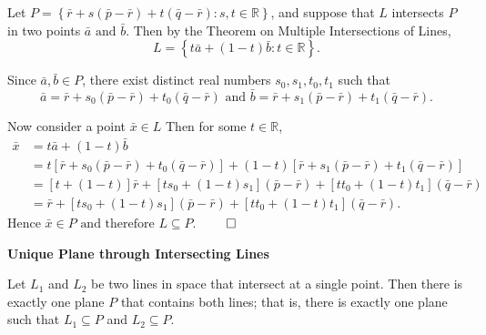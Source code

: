 \begin{proofbox}
    Let \(P = \left\{ \bar{r} + s(\bar{p} - \bar{r}) + t(\bar{q} - \bar{r}) : s, t \in \mathbb{R} \right\}\), and suppose that \(L\) intersects
    \(P\) in two points \(\bar{a} \text{ and } \bar{b}\). Then by the Theorem on Multiple Intersections of Lines,
    \[
    L = \left\{t\bar{a} + (1 - t)\bar{b} : t \in \mathbb{R}\right\}.
    \]

    Since \(\bar{a},\bar{b} \in P\), there exist distinct real numbers \(s_0,s_1,t_0,t_1\) such that
    \[
    \bar{a} = \bar{r} + s_0(\bar{p} - \bar{r}) + t_0(\bar{q} - \bar{r}) \text{ and } \bar{b} = \bar{r} + s_1(\bar{p} - \bar{r}) + t_1(\bar{q} - \bar{r}).
    \]

    Now consider a point \(\bar{x} \in L\) Then for some \(t \in \mathbb{R}\),
   \[
\begin{aligned}
\bar{x} &= t\bar{a} + (1 - t)\bar{b} \\
&= t\left[ \bar{r} + s_0(\bar{p} - \bar{r}) + t_0(\bar{q} - \bar{r}) \right] + (1 - t)\left[ \bar{r} + s_1(\bar{p} - \bar{r}) + t_1(\bar{q} - \bar{r}) \right] \\
&= [t + (1 - t)]\bar{r} + [ts_0 + (1 - t)s_1](\bar{p} - \bar{r}) + [tt_0 + (1 - t)t_1](\bar{q} - \bar{r}) \\
&= \bar{r} + [ts_0 + (1 - t)s_1](\bar{p} - \bar{r}) + [tt_0 + (1 - t)t_1](\bar{q} - \bar{r}).
\end{aligned}
\]
Hence \(\bar{x} \in P \text{ and therefore } L \subseteq P.\)
 \hfill $\qed$
\end{proofbox}
 
\begin{theorembox}

  \textbf{Unique Plane through Intersecting Lines}

  Let \(L_1\) and \(L_2\) be two lines in space that intersect at a single point. Then there is exactly one plane \(P\) that contains both lines; that is, 
  there is exactly one plane such that \(L_1 \subseteq P\) and \(L_2 \subseteq P\).

\end{theorembox}
        
